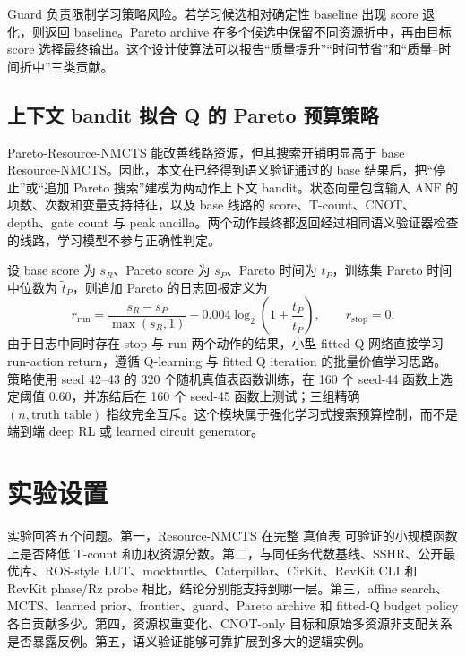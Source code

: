 \documentclass[UTF8,fontset=fandol,11pt]{ctexart}
\newcommand{\method}{Resource-NMCTS}
\newcommand{\anf}{\ensuremath{\mathrm{ANF}}}
\newcommand{\mcts}{\ensuremath{\mathrm{MCTS}}}
\newcommand{\ttable}{真值表}
\begin{document}
Guard 负责限制学习策略风险。若学习候选相对确定性 baseline 出现 score 退化，则返回 baseline。Pareto archive 在多个候选中保留不同资源折中，再由目标 score 选择最终输出。这个设计使算法可以报告“质量提升”“时间节省”和“质量--时间折中”三类贡献。

\subsection{上下文 bandit 拟合 Q 的 Pareto 预算策略}

Pareto-\method{} 能改善线路资源，但其搜索开销明显高于 base \method{}。因此，本文在已经得到语义验证通过的 base 结果后，把“停止”或“追加 Pareto 搜索”建模为两动作上下文 bandit\cite{li2010contextual}。状态向量包含输入 \anf{} 的项数、次数和变量支持特征，以及 base 线路的 score、T-count、CNOT、depth、gate count 与 peak ancilla。两个动作最终都返回经过相同语义验证器检查的线路，学习模型不参与正确性判定。

设 base score 为 $s_R$、Pareto score 为 $s_P$、Pareto 时间为 $t_P$，训练集 Pareto 时间中位数为 $\widetilde t_P$，则追加 Pareto 的日志回报定义为
\begin{equation}
r_{\mathrm{run}}=
\frac{s_R-s_P}{\max(s_R,1)}
-0.004\log_2\!\left(1+\frac{t_P}{\widetilde t_P}\right),
\qquad
r_{\mathrm{stop}}=0 .
\label{eq:budget-policy-reward}
\end{equation}
由于日志中同时存在 stop 与 run 两个动作的结果，小型 fitted-Q 网络直接学习 run-action return，遵循 Q-learning 与 fitted Q iteration 的批量价值学习思路\cite{watkins1992qlearning,ernst2005fittedq}。策略使用 seed 42--43 的 320 个随机真值表函数训练，在 160 个 seed-44 函数上选定阈值 0.60，并冻结后在 160 个 seed-45 函数上测试；三组精确 $(n,\text{truth table})$ 指纹完全互斥。这个模块属于强化学习式搜索预算控制，而不是端到端 deep RL 或 learned circuit generator。

\section{实验设置}

实验回答五个问题。第一，\method{} 在完整 \ttable{} 可验证的小规模函数上是否降低 T-count 和加权资源分数。第二，与同任务代数基线、SSHR、公开最优库、ROS-style LUT、mockturtle、Caterpillar、CirKit、RevKit CLI 和 RevKit phase/Rz probe 相比，结论分别能支持到哪一层。第三，affine search、\mcts{}、learned prior、frontier、guard、Pareto archive 和 fitted-Q budget policy 各自贡献多少。第四，资源权重变化、CNOT-only 目标和原始多资源非支配关系是否暴露反例。第五，语义验证能够可靠扩展到多大的逻辑实例。
\end{document}
